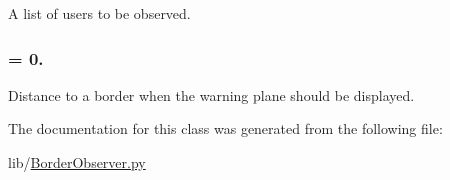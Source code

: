 \-A list of users to be observed. 

\hypertarget{classlib_1_1BorderObserver_1_1BorderObserver_a9521c87181073a5123559b5debf7238f}{
\subsubsection[{warning\-\_\-tolerance}]{ = 0.}}\label{classlib_1_1BorderObserver_1_1BorderObserver_a9521c87181073a5123559b5debf7238f}


\-Distance to a border when the warning plane should be displayed. 



\-The documentation for this class was generated from the following file\-:\begin{DoxyCompactItemize}
\item 
lib/\hyperlink{BorderObserver_8py}{\-Border\-Observer.\-py}\end{DoxyCompactItemize}
